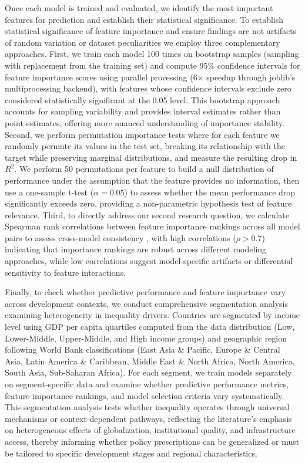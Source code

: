 \documentclass[10pt,twocolumn]{article}
\begin{document}
\par Once each model is trained and evaluated, we identify the most important features for prediction and establish their statistical significance. To establish statistical significance of feature importance and ensure findings are not artifacts of random variation or dataset peculiarities we employ three complementary approaches. First, we train each model 100 times on bootstrap samples (sampling with replacement from the training set) and compute 95\% confidence intervals for feature importance scores using parallel processing (6$\times$ speedup through joblib's multiprocessing backend), with features whose confidence intervals exclude zero considered statistically significant at the 0.05 level. This bootstrap approach accounts for sampling variability and provides interval estimates rather than point estimates, offering more nuanced understanding of importance stability. Second, we perform permutation importance tests where for each feature we randomly permute its values in the test set, breaking its relationship with the target while preserving marginal distributions, and measure the resulting drop in $R^2$. We perform 50 permutations per feature to build a null distribution of performance under the assumption that the feature provides no information, then use a one-sample t-test ($\alpha=0.05$) to assess whether the mean performance drop significantly exceeds zero, providing a non-parametric hypothesis test of feature relevance. Third, to directly address our second research question, we calculate Spearman rank correlations \cite{spearman1904proof} between feature importance rankings across all model pairs to assess cross-model consistency \cite{wei2022feature,zeng2021feature}, with high correlations ($\rho > 0.7$) indicating that importance rankings are robust across different modeling approaches, while low correlations suggest model-specific artifacts or differential sensitivity to feature interactions.
\par Finally, to check whether predictive performance and feature importance vary across development contexts, we conduct comprehensive segmentation analysis examining heterogeneity in inequality drivers. Countries are segmented by income level using GDP per capita quartiles computed from the data distribution (Low, Lower-Middle, Upper-Middle, and High income groups) and geographic region following World Bank classifications (East Asia \& Pacific, Europe \& Central Asia, Latin America \& Caribbean, Middle East \& North Africa, North America, South Asia, Sub-Saharan Africa). For each segment, we train models separately on segment-specific data and examine whether predictive performance metrics, feature importance rankings, and model selection criteria vary systematically. This segmentation analysis tests whether inequality operates through universal mechanisms or context-dependent pathways, reflecting the literature's emphasis on heterogeneous effects of globalization, institutional quality, and infrastructure access, thereby informing whether policy prescriptions can be generalized or must be tailored to specific development stages and regional characteristics.
\end{document}
